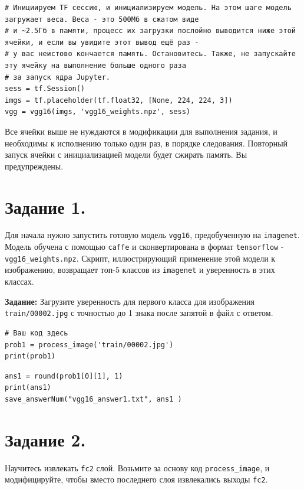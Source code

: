 \documentclass[11pt,a4paper]{article}
\begin{document}
\begin{verbatim}
# Инициируем TF сессию, и инициализируем модель. На этом шаге модель загружает веса. Веса - это 500Мб в сжатом виде
# и ~2.5Гб в памяти, процесс их загрузки послойно выводится ниже этой ячейки, и если вы увидите этот вывод ещё раз - 
# у вас неистово кончается память. Остановитесь. Также, не запускайте эту ячейку на выполнение больше одного раза
# за запуск ядра Jupyter.
sess = tf.Session()
imgs = tf.placeholder(tf.float32, [None, 224, 224, 3])
vgg = vgg16(imgs, 'vgg16_weights.npz', sess)
\end{verbatim}

Все ячейки выше не нуждаются в модификации для выполнения задания, и необходимы к исполнению только один раз, в порядке следования. Повторный запуск ячейки с инициализацией модели будет сжирать память. Вы предупреждены.

\section{Задание 1.}

Для начала нужно запустить готовую модель \texttt{vgg16}, предобученную на \texttt{imagenet}. Модель обучена с помощью \texttt{caffe} и сконвертирована в формат \texttt{tensorflow} - \texttt{vgg16_weights.npz}. Скрипт, иллюстрирующий применение этой модели к изображению, возвращает топ-5 классов из \texttt{imagenet} и уверенность в этих классах.

\textbf{Задание:} Загрузите уверенность для первого класса для изображения \texttt{train/00002.jpg} с точностью до 1 знака после запятой в файл с ответом.

\begin{verbatim}
# Ваш код здесь
prob1 = process_image('train/00002.jpg')
print(prob1)
\end{verbatim}

\begin{verbatim}
ans1 = round(prob1[0][1], 1)
print(ans1)
save_answerNum("vgg16_answer1.txt", ans1 )
\end{verbatim}

\section{Задание 2.}

Научитесь извлекать \texttt{fc2} слой. Возьмите за основу код \texttt{process_image}, и модифицируйте, чтобы вместо последнего слоя извлекались выходы \texttt{fc2}.
\end{document}
